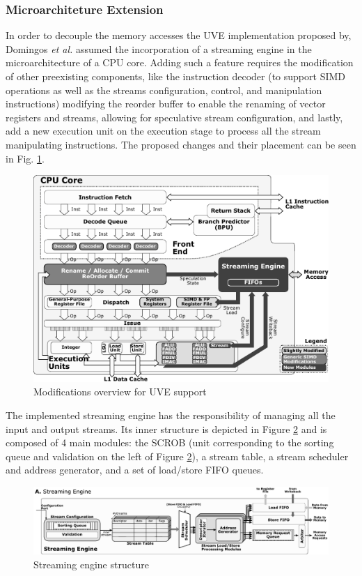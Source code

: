 \subsubsection{Microarchiteture Extension}

In order to decouple the memory accesses the \acrshort{UVE} implementation proposed by, Domingos \textit{et al.} \cite{uve-paper} assumed the incorporation of a streaming engine in the microarchitecture of a CPU core. Adding such a feature requires the modification of other preexisting components, like the instruction decoder (to support SIMD operations as well as the streams configuration, control, and manipulation instructions)  modifying the reorder buffer to enable the renaming of vector registers and streams, allowing for speculative stream configuration, and lastly, add a new execution unit on the execution stage to process all the stream manipulating instructions. The proposed changes and their placement can be seen in Fig. \ref{fig:uve-arch}.

\begin{figure}[H]
	\begin{center}
 		\includegraphics[width=0.67\linewidth]{images/UVE-arch.pdf}
 		\caption{Modifications overview for UVE support}
 		\label{fig:uve-arch}
	\end{center} 
\end{figure}

The implemented streaming engine has the responsibility of managing all the input and output streams. Its inner structure is depicted in Figure \ref{fig:uve-engine} and is composed of 4 main modules: the \acrfull{SCROB} (unit corresponding to the sorting queue and validation on the left of Figure \ref{fig:uve-engine}), a stream table, a stream scheduler and address generator, and a set of load/store FIFO queues.

\begin{figure}[H]
	\begin{center}
 		\includegraphics[width=0.97\linewidth]{images/uve-engine.pdf}
 		\caption{Streaming engine structure}
 		\label{fig:uve-engine}
	\end{center} 
\end{figure}


